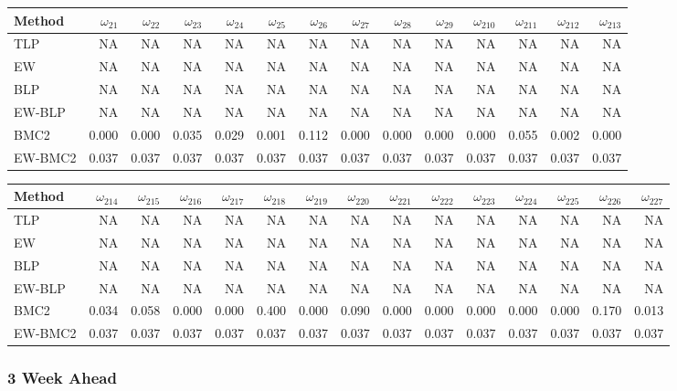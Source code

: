 \documentclass[
]{article}
\begin{document}
\begin{tabular}{lrrrrrrrrrrrrr}
\toprule
Method & $\omega_{21}$ & $\omega_{22}$ & $\omega_{23}$ & $\omega_{24}$ & $\omega_{25}$ & $\omega_{26}$ & $\omega_{27}$ & $\omega_{28}$ & $\omega_{29}$ & $\omega_{210}$ & $\omega_{211}$ & $\omega_{212}$ & $\omega_{213}$\\
\midrule
TLP & NA & NA & NA & NA & NA & NA & NA & NA & NA & NA & NA & NA & NA\\
EW & NA & NA & NA & NA & NA & NA & NA & NA & NA & NA & NA & NA & NA\\
BLP & NA & NA & NA & NA & NA & NA & NA & NA & NA & NA & NA & NA & NA\\
EW-BLP & NA & NA & NA & NA & NA & NA & NA & NA & NA & NA & NA & NA & NA\\
BMC2 & 0.000 & 0.000 & 0.035 & 0.029 & 0.001 & 0.112 & 0.000 & 0.000 & 0.000 & 0.000 & 0.055 & 0.002 & 0.000\\
EW-BMC2 & 0.037 & 0.037 & 0.037 & 0.037 & 0.037 & 0.037 & 0.037 & 0.037 & 0.037 & 0.037 & 0.037 & 0.037 & 0.037\\
\bottomrule
\end{tabular}

\begin{tabular}{lrrrrrrrrrrrrrr}
\toprule
Method & $\omega_{214}$ & $\omega_{215}$ & $\omega_{216}$ & $\omega_{217}$ & $\omega_{218}$ & $\omega_{219}$ & $\omega_{220}$ & $\omega_{221}$ & $\omega_{222}$ & $\omega_{223}$ & $\omega_{224}$ & $\omega_{225}$ & $\omega_{226}$ & $\omega_{227}$\\
\midrule
TLP & NA & NA & NA & NA & NA & NA & NA & NA & NA & NA & NA & NA & NA & NA\\
EW & NA & NA & NA & NA & NA & NA & NA & NA & NA & NA & NA & NA & NA & NA\\
BLP & NA & NA & NA & NA & NA & NA & NA & NA & NA & NA & NA & NA & NA & NA\\
EW-BLP & NA & NA & NA & NA & NA & NA & NA & NA & NA & NA & NA & NA & NA & NA\\
BMC2 & 0.034 & 0.058 & 0.000 & 0.000 & 0.400 & 0.000 & 0.090 & 0.000 & 0.000 & 0.000 & 0.000 & 0.000 & 0.170 & 0.013\\
EW-BMC2 & 0.037 & 0.037 & 0.037 & 0.037 & 0.037 & 0.037 & 0.037 & 0.037 & 0.037 & 0.037 & 0.037 & 0.037 & 0.037 & 0.037\\
\bottomrule
\end{tabular}

\hypertarget{week-ahead-22}{%
\subsubsection{3 Week Ahead}\label{week-ahead-22}}
\end{document}
